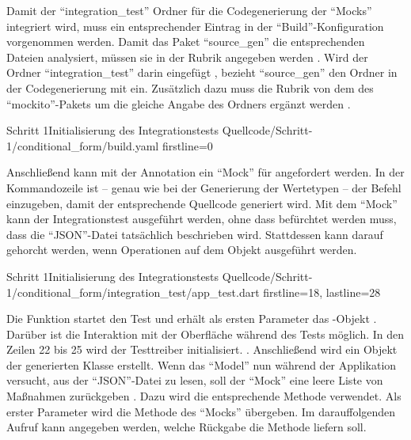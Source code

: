 Damit der \enquote{integration_test} Ordner für die Codegenerierung der \enquote{Mocks} integriert wird, muss ein entsprechender Eintrag in der \enquote{Build}-Konfiguration vorgenommen werden.
Damit das Paket \enquote{source_gen} die entsprechenden Dateien analysiert, müssen sie in der Rubrik  angegeben werden .
Wird der Ordner \enquote{integration_test} darin eingefügt , bezieht \enquote{source_gen} den Ordner in der Codegenerierung mit ein.
Zusätzlich dazu muss die Rubrik  von dem  des \enquote{mockito}-Pakets  um die gleiche Angabe des Ordners ergänzt werden .

\begin{alexyamllisting}{Schritt 1}{Initialisierung des Integrationstests}
  {Quellcode/Schritt-1/conditional_form/build.yaml}
  {firstline=0}
  \label{lst:Schritt1IntegrationsTestInitialisierung}
\end{alexyamllisting}

Anschließend kann mit der Annotation   ein \enquote{Mock} für  angefordert werden.
In der Kommandozeile ist -- genau wie bei der Generierung der Wertetypen -- der Befehl  einzugeben, damit der entsprechende Quellcode generiert wird.
Mit dem \enquote{Mock} kann der Integrationstest ausgeführt werden, ohne dass befürchtet werden muss, dass die \enquote{JSON}-Datei tatsächlich beschrieben wird.
Stattdessen kann darauf gehorcht werden, wenn Operationen auf dem Objekt ausgeführt werden. 

\begin{alexlisting}{Schritt 1}{Initialisierung des Integrationstests}
  {Quellcode/Schritt-1/conditional_form/integration_test/app_test.dart}
  {firstline=18, lastline=28}
  \label{lst:Schritt1IntegrationsTestInitialisierung}
\end{alexlisting}

Die Funktion  startet den Test und erhält als ersten Parameter das -Objekt .
Darüber ist die Interaktion mit der Oberfläche während des Tests möglich.
In den Zeilen 22 bis 25 wird der Testtreiber initialisiert. .
Anschließend wird ein Objekt der generierten Klasse  erstellt.
Wenn das \enquote{Model} nun während der Applikation versucht, aus der \enquote{JSON}-Datei zu lesen, soll der \enquote{Mock} eine leere Liste von Maßnahmen zurückgeben .
Dazu wird die entsprechende Methode  verwendet.
Als erster Parameter wird die Methode  des \enquote{Mocks} übergeben.
Im darauffolgenden Aufruf  kann angegeben werden, welche Rückgabe die Methode liefern soll.

